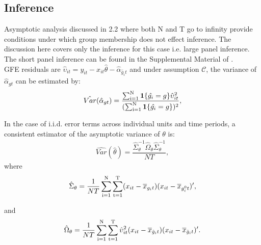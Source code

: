 \subsection{Inference}
Asymptotic analysis discussed in 2.2 where both N and T go to infinity provide conditions under which group membership does not effect inference. The discussion here covers only the inference for this case i.e. large panel inference. The short panel inference can be found in the Supplemental Material of \textcite{bonhomme2015grouped}.\\
GFE residuals are  $\hat{\upsilon}_{it} = y_{it} - x_{it}\hat{\theta} - \hat{\alpha}_{\hat{g}_it}$ and under assumption $\mathcal{C}$, the variance of $\hat{\alpha}_{gt}$ can be estimated by:
\begin{align}
\hat{Var}(\hat\alpha_{gt}) = \dfrac{\operatorname*{\sum_{i=1}^N} \operatorname*{\textbf{1}}\{\hat{g_i} = g\}\hat{\upsilon}_{it}^2}{(\operatorname*{\sum_{i=1}^N} \operatorname*{\textbf{1}}\{\hat{g_i} = g\})^2},
\end{align}

In the case of i.i.d. error terms across individual units and time periods, a consistent estimator of the asymptotic variance of $\theta$ is:
\begin{align}
\hat{Var}(\hat\theta) = \dfrac{\hat{\Sigma}_\theta^{-1} \hat{\Omega}_\theta \hat{\Sigma}_\theta^{-1}}{NT},
\end{align}
where
\begin{align*}
    \hat{\Sigma}_\theta = \dfrac{1}{NT} \operatorname*{\sum_{i=1}^N} \operatorname*{\sum_{t=1}^T} (x_{it} - \overline{x}_{g_it})(x_{it} - \overline{x}_{g_i^0t})',
\end{align*}

and 
\begin{align*}
    \hat{\Omega}_\theta = \dfrac{1}{NT} \operatorname*{\sum_{i=1}^N} \operatorname*{\sum_{t=1}^T} \hat{\upsilon}_{it}^2 (x_{it} - \overline{x}_{\hat{g}_it})(x_{it} - \overline{x}_{\hat{g}_it})'.
\end{align*}






